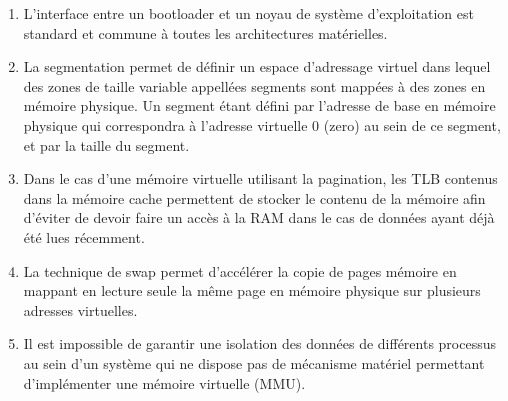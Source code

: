 \begin{enumerate}

\item L'interface entre un bootloader et un noyau de syst\`eme d'exploitation est standard et commune \`a toutes les architectures mat\'erielles.

\item La segmentation permet de d\'efinir un espace d'adressage virtuel dans lequel des zones de taille variable appell\'ees segments sont mapp\'ees \`a des zones en m\'emoire physique. Un segment \'etant d\'efini par l'adresse de base en m\'emoire physique qui correspondra \`a l'adresse virtuelle 0 (zero) au sein de ce segment, et par la taille du segment.

\item Dans le cas d'une m\'emoire virtuelle utilisant la pagination, les TLB contenus dans la m\'emoire cache permettent de stocker le contenu de la m\'emoire afin d'\'eviter de devoir faire un acc\`es \`a la RAM dans le cas de donn\'ees ayant d\'ej\`a \'et\'e lues r\'ecemment.

\item La technique de swap permet d'acc\'el\'erer la copie de pages m\'emoire en mappant en lecture seule la m\^eme page en m\'emoire physique sur plusieurs adresses virtuelles.

\item Il est impossible de garantir une isolation des donn\'ees de diff\'erents processus au sein d'un syst\`eme qui ne dispose pas de m\'ecanisme mat\'eriel permettant d'impl\'ementer une m\'emoire virtuelle (MMU).

\end{enumerate}


